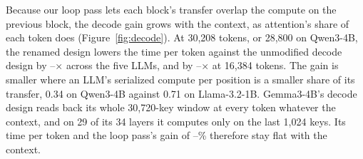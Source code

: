 \label{subsec:decode-eval}
Because our loop pass lets each block's transfer overlap the compute on the previous block, the decode gain grows with the context, as attention's share of each token does (Figure~\ref{fig:decode}).
At 30{,}208 tokens, or 28{,}800 on Qwen3-4B, the renamed design lowers the time per token against the unmodified decode design by \DecodeGainLo--\DecodeGainHi$\times$ across the five LLMs, and by \DecodeMidLo--\DecodeMidHi$\times$ at 16{,}384 tokens.
The gain is smaller where an LLM's serialized compute per position is a smaller share of its transfer, 0.34 on Qwen3-4B against 0.71 on Llama-3.2-1B.
Gemma3-4B's decode design reads back its whole 30{,}720-key window at every token whatever the context, and on 29 of its 34 layers it computes only on the last 1{,}024 keys.
Its time per token and the loop pass's gain of \DecodeGemmaLo--\DecodeGemmaHi\% therefore stay flat with the context.


